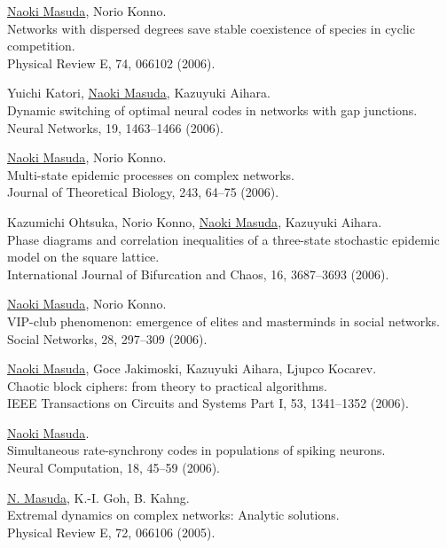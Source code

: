 \documentclass[11pt,letter]{article}
\begin{document}
\begin{etaremune}
\item \underline{Naoki Masuda}, Norio Konno.\\
Networks with dispersed degrees save stable coexistence of species in cyclic competition.\\
Physical Review E, 74, 066102 (2006).

\item Yuichi Katori, \underline{Naoki Masuda}, Kazuyuki Aihara.\\
Dynamic switching of optimal neural codes in networks with gap junctions.\\
Neural Networks, 19, 1463--1466 (2006).

\item \underline{Naoki Masuda}, Norio Konno.\\
Multi-state epidemic processes on complex networks.\\
Journal of Theoretical Biology, 243, 64--75 (2006).

\item Kazumichi Ohtsuka, Norio Konno, \underline{Naoki Masuda}, Kazuyuki Aihara.\\
Phase diagrams and correlation inequalities of a three-state stochastic epidemic model on the square lattice.\\
International Journal of Bifurcation and Chaos, 16, 3687--3693 (2006).

\item \underline{Naoki Masuda}, Norio Konno.\\
VIP-club phenomenon: emergence of elites and masterminds in social networks.\\
Social Networks, 28, 297--309 (2006).

\item \underline{Naoki Masuda}, Goce Jakimoski, Kazuyuki Aihara, Ljupco Kocarev.\\
Chaotic block ciphers: from theory to practical algorithms.\\
IEEE Transactions on Circuits and Systems Part I, 53, 1341--1352 (2006).

\item \underline{Naoki Masuda}.\\
Simultaneous rate-synchrony codes in populations of spiking neurons.\\
Neural Computation, 18, 45--59 (2006).

\item \underline{N. Masuda}, K.-I. Goh, B. Kahng.\\
Extremal dynamics on complex networks: Analytic solutions.\\
Physical Review E, 72, 066106 (2005).


\end{etaremune}
\end{document}
